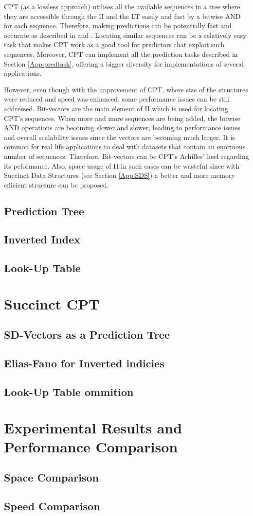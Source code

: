CPT (as a lossless approach) utilises all the available sequences in a tree where they are accessible through the II and the LT easily and fast by a bitwise AND for each sequence. Therefore, making predictions can be potentially fast and accurate as described in \citep{gueniche_fournier-viger_tseng_2013} and \citep{gueniche_fournier-viger_raman_tseng_2015}. Locating similar sequences can be a relatively easy task that makes CPT work as a good tool for predictors that exploit such sequences. Moreover, CPT can implement all the prediction tasks described in Section \ref{App:predtask}, offering a bigger diversity for implementations of several applications. 
\par However, even though with the improvement of CPT, where size of the structures were reduced and speed was enhanced, some performance issues can be still addressed. Bit-vectors are the main element of II which is used for locating CPT's sequences. When more and more sequences are being added, the bitwise AND operations are becoming slower and slower, leading to performance issues and overall scalability issues since the vectors are becoming much larger. It is common for real life applications to deal with datasets that contain an enormous number of sequences. Therefore, Bit-vectors can be CPT's Achilles' heel regarding its peformance. Also, space usage of II in such cases can be wasteful since with Succinct Data Structures (see Section \ref{App:SDS}) a better and more memory efficient structure can be proposed.
\subsection{Prediction Tree}
\subsection{Inverted Index}
\subsection{Look-Up Table}
\section{Succinct CPT}
\subsection{SD-Vectors as a Prediction Tree}
\subsection{Elias-Fano for Inverted indicies}
\subsection{Look-Up Table ommition}
\section{Experimental Results and Performance Comparison}
\subsection{Space Comparison}
\subsection{Speed Comparison}



\newpage